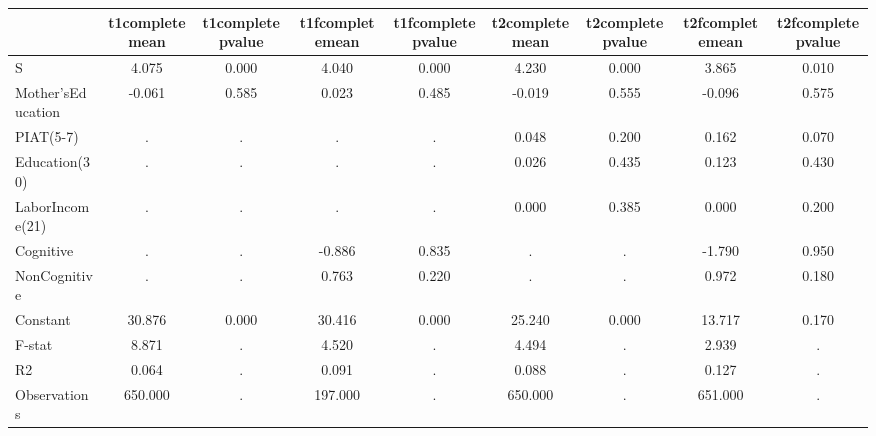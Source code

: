 \begin{table}[htbp]
\begin{tabular}{lcccccccc} \hline \hline
 & t1completemean  & t1completepvalue  & t1fcompletemean  & t1fcompletepvalue  & t2completemean  & t2completepvalue  & t2fcompletemean  & t2fcompletepvalue  \\  \hline 
S &     4.075 &     0.000 &     4.040 &     0.000 &     4.230 &     0.000 &     3.865 &     0.010 \\  
Mother'sEducation &    -0.061 &     0.585 &     0.023 &     0.485 &    -0.019 &     0.555 &    -0.096 &     0.575 \\  
PIAT(5-7) &         . &         . &         . &         . &     0.048 &     0.200 &     0.162 &     0.070 \\  
Education(30) &         . &         . &         . &         . &     0.026 &     0.435 &     0.123 &     0.430 \\  
LaborIncome(21) &         . &         . &         . &         . &     0.000 &     0.385 &     0.000 &     0.200 \\  
Cognitive &         . &         . &    -0.886 &     0.835 &         . &         . &    -1.790 &     0.950 \\  
NonCognitive &         . &         . &     0.763 &     0.220 &         . &         . &     0.972 &     0.180 \\  
Constant &    30.876 &     0.000 &    30.416 &     0.000 &    25.240 &     0.000 &    13.717 &     0.170 \\  
F-stat &     8.871 &         . &     4.520 &         . &     4.494 &         . &     2.939 &         . \\  
R2 &     0.064 &         . &     0.091 &         . &     0.088 &         . &     0.127 &         . \\  
Observations &   650.000 &         . &   197.000 &         . &   650.000 &         . &   651.000 &         . \\  
\hline \hline \end{tabular}
\end{table}
